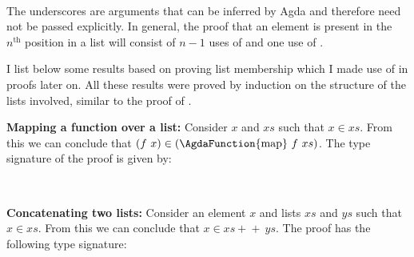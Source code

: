 \documentclass[12pt,a4paper,twoside,openright]{report}
\newcommand{\C}{\AgdaInductiveConstructor}
\newcommand{\F}{\AgdaFunction}
\begin{document}
\begin{code}
\> \AgdaSymbol{:}   \AgdaSymbol{(}        \AgdaInductiveConstructor{[]}\AgdaSymbol{)}\<%
\\
\> \AgdaSymbol{=}  \AgdaSymbol{\_} \AgdaSymbol{\_} \AgdaSymbol{\_} \AgdaSymbol{(} \AgdaSymbol{\_} \AgdaSymbol{\_} \AgdaSymbol{\_} \AgdaSymbol{(} \AgdaSymbol{\_} \AgdaSymbol{\_))}\<%
\end{code}
The underscores are arguments that can be inferred by Agda and therefore need not be passed explicitly.  
In general, the proof that an element is present in the $n^\textrm{th}$ position in a list will consist of $n-1$ uses of \C{there} and one use of \C{here}.

I list below some results based on proving list membership which I made use of in proofs later on. All these results were proved by induction on the structure of the lists involved, similar to the proof of \F{>\!\!>\!=$_l$-map}.

{\bf Mapping a function over a list:}
Consider $x$ and $xs$ such that $x \in xs$. From this we can conclude that  $(f\ x) \in (\textrm{\F{map}}\ f\ xs)$. The type signature of the proof is given by:

\begin{code}
\> \AgdaSymbol{:} \>[16]\AgdaSymbol{\{}  \AgdaSymbol{:} \AgdaSymbol{\}}  \AgdaSymbol{(} \AgdaSymbol{:} \AgdaSymbol{)}  \AgdaSymbol{(} \AgdaSymbol{:}  \AgdaSymbol{)}  \AgdaSymbol{(} \AgdaSymbol{:}   \AgdaSymbol{)}  \<
\\
\>[2]\<[16]%
\>[16]         \<%
\end{code}

{\bf Concatenating two lists:}
Consider an element $x$ and lists $xs$ and $ys$ such that $x \in xs$. From this we can conclude that $x \in xs +\!\!+\ ys$. The proof has the following type signature:
\end{document}
